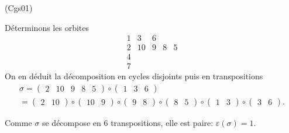 \begin{tiny}(Cgs01)\end{tiny} Déterminons les orbites
\[
  \begin{matrix}
    1 & 3  & 6 &   &   \\
    2 & 10 & 9 & 8 & 5 \\
    4 &    &   &   &   \\
    7 &    &   &   &   
  \end{matrix}
\]
On en déduit la décomposition en cycles disjoints puis en transpositions
\begin{multline*}
  \sigma =
  \begin{pmatrix}
    2 & 10 & 9 & 8 & 5
  \end{pmatrix}
  \circ 
  \begin{pmatrix}
    1 & 3  & 6
  \end{pmatrix}\\
  =
  \begin{pmatrix}
    2 & 10
  \end{pmatrix}
  \circ
  \begin{pmatrix}
    10 & 9
  \end{pmatrix}
  \circ
  \begin{pmatrix}
    9 & 8
  \end{pmatrix}
  \circ
  \begin{pmatrix}
    8 & 5
  \end{pmatrix}
  \circ
  \begin{pmatrix}
    1 & 3
  \end{pmatrix}
  \circ
  \begin{pmatrix}
    3 & 6
  \end{pmatrix}
  .
\end{multline*}

Comme $\sigma$ se décompose en 6 transpositions, elle est paire: $\varepsilon(\sigma) = 1$.
